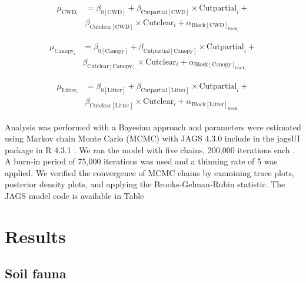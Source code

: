 \begin{align}
  \mu_{\text{CWD}_i} &= \beta_{0[\text{CWD}]} + \beta_{\text{Cutpartial}[\text{CWD}]} \times \text{Cutpartial}_{i} + \nonumber\\
  & \beta_{\text{Cutclear}[\text{CWD}]} \times \text{Cutclear}_{i} + \alpha_{\text{Block}[\text{CWD}]_{\text{block}_i}} 
\end{align}


\begin{align}
  \mu_{\text{Canopy}_i} &= \beta_{0[\text{Canopy}]} + \beta_{\text{Cutpartial}[\text{Canopy}]} \times \text{Cutpartial}_{i} + \nonumber \\
  & \beta_{\text{Cutclear}[\text{Canopy}]} \times \text{Cutclear}_{i} + \alpha_{\text{Block}[\text{Canopy}]_{\text{block}_i}} \nonumber
\end{align}

\begin{align}
  \mu_{\text{Litter}_i} &= \beta_{0[\text{Litter}]} + \beta_{\text{Cutpartial}[\text{Litter}]} \times \text{Cutpartial}_{i} + \nonumber\\
  & \beta_{\text{Cutclear}[\text{Litter}]} \times \text{Cutclear}_{i} + \alpha_{\text{Block}[\text{Litter}]_{\text{block}_i}} \nonumber
\end{align}


Analysis was performed with a Bayesian approach and parameters were estimated using Markov chain Monte Carlo (MCMC) with JAGS 4.3.0 include in the jagsUI package in R 4.3.1 \citep{lunnBUGSProjectEvolution2009,kellnerJagsUIWrapperRjags2024,rcoreteamLanguageEnvironmentStatistical2020}. 
We ran the model with five chains, 200,000 iterations each \citep{gelmanUnderstandingPredictiveInformation2014}. A burn-in period of 75,000 iterations was used and a thinning rate of 5 was applied. 
We verified the convergence of MCMC chains by examining trace plots, posterior density plots, and applying the Brooks-Gelman-Rubin statistic. 
The JAGS model code is available in Table

\clearpage

\section*{Results}
\label{sec:results1}


\subsection*{Soil fauna}
\label{subsec:taxa}

